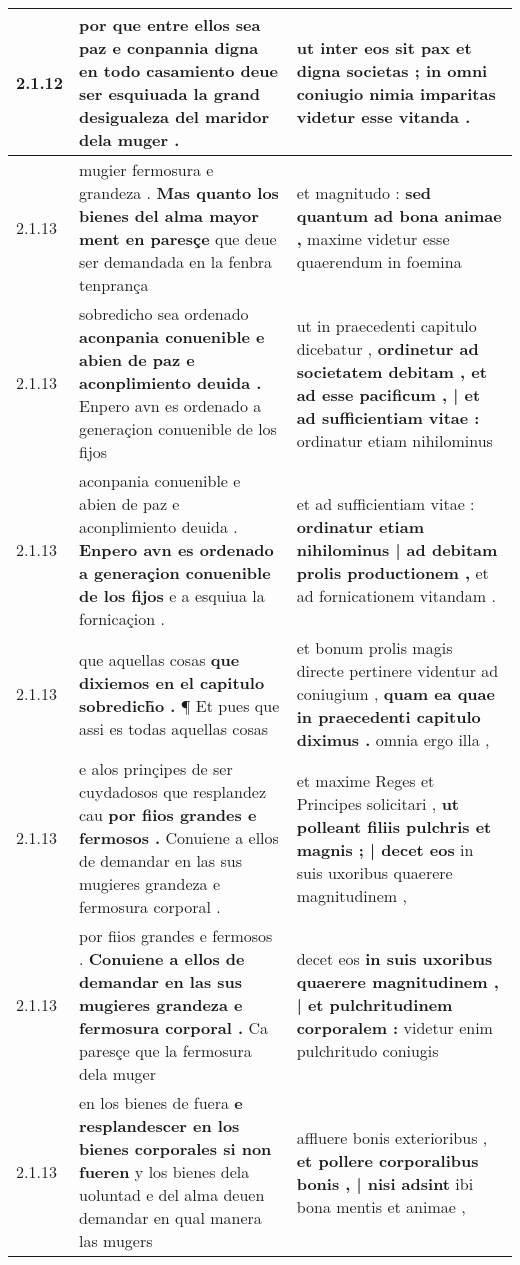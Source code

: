 \begin{tabular}{|p{1cm}|p{6.5cm}|p{6.5cm}|}
2.1.12 & por que entre ellos sea paz \textbf{ e conpannia digna en todo casamiento } deue ser esquiuada la grand desigualeza del maridor dela muger . & ut inter eos sit pax et digna societas ; \textbf{ in omni coniugio } nimia imparitas videtur esse vitanda . \\\hline
2.1.13 & mugier fermosura e grandeza . \textbf{ Mas quanto los bienes del alma mayor ment en paresçe } que deue ser demandada en la fenbra tenprança & et magnitudo : \textbf{ sed quantum ad bona animae , } maxime videtur esse quaerendum in foemina \\\hline
2.1.13 & sobredicho sea ordenado \textbf{ aconpania conuenible e abien de paz e aconplimiento deuida . } Enpero avn es ordenado a generaçion conuenible de los fijos & ut in praecedenti capitulo dicebatur , \textbf{ ordinetur ad societatem debitam , et ad esse pacificum , | et ad sufficientiam vitae : } ordinatur etiam nihilominus \\\hline
2.1.13 & aconpania conuenible e abien de paz e aconplimiento deuida . \textbf{ Enpero avn es ordenado a generaçion conuenible de los fijos } e a esquiua la fornicaçion . & et ad sufficientiam vitae : \textbf{ ordinatur etiam nihilominus | ad debitam prolis productionem , } et ad fornicationem vitandam . \\\hline
2.1.13 & que aquellas cosas \textbf{ que dixiemos en el capitulo sobredich̃o . } ¶ Et pues que assi es todas aquellas cosas & et bonum prolis magis directe pertinere videntur ad coniugium , \textbf{ quam ea quae in praecedenti capitulo diximus . } omnia ergo illa , \\\hline
2.1.13 & e alos prinçipes de ser cuydadosos que resplandez cau \textbf{ por fiios grandes e fermosos . } Conuiene a ellos de demandar en las sus mugieres grandeza e fermosura corporal . & et maxime Reges et Principes solicitari , \textbf{ ut polleant filiis pulchris et magnis ; | decet eos } in suis uxoribus quaerere magnitudinem , \\\hline
2.1.13 & por fiios grandes e fermosos . \textbf{ Conuiene a ellos de demandar en las sus mugieres grandeza e fermosura corporal . } Ca paresçe que la fermosura dela muger & decet eos \textbf{ in suis uxoribus quaerere magnitudinem , | et pulchritudinem corporalem : } videtur enim pulchritudo coniugis \\\hline
2.1.13 & en los bienes de fuera \textbf{ e resplandescer en los bienes corporales si non fueren } y los bienes dela uoluntad e del alma deuen demandar en qual manera las mugers & affluere bonis exterioribus , \textbf{ et pollere corporalibus bonis , | nisi adsint } ibi bona mentis et animae , \\\hline

\end{tabular}
